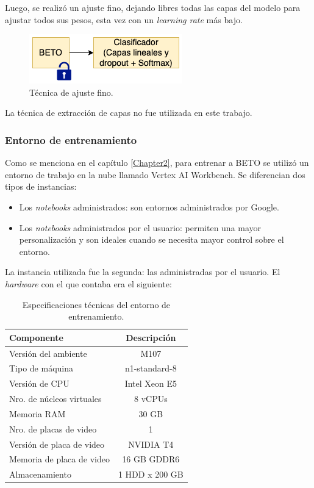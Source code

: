 Luego, se realizó un ajuste fino, dejando libres todas las capas del modelo para ajustar todos sus pesos, esta vez con un \textit{learning rate} más bajo.

\begin{figure}[htbp]
	\centering
	\includegraphics[width=.4\textwidth]{./Figures/cap3-fine-tuning.png}
	\caption{Técnica de ajuste fino.}
	\label{fig:cap3-fine-tuning}
\end{figure}

La técnica de extracción de capas no fue utilizada en este trabajo.

\subsubsection{Entorno de entrenamiento}

Como se menciona en el capítulo \ref{Chapter2}, para entrenar a BETO se utilizó un entorno de trabajo en la nube llamado Vertex AI Workbench. Se diferencian dos tipos de instancias:
\begin{itemize}
	\item Los \textit{notebooks} administrados: son entornos administrados por Google.
	\item Los \textit{notebooks} administrados por el usuario: permiten una mayor personalización y son ideales cuando se necesita mayor control sobre el entorno.
\end{itemize}

La instancia utilizada fue la segunda: las administradas por el usuario. El \textit{hardware} con el que contaba era el siguiente:
\begin{table}[h]
	\centering
	\caption[Especificaciones técnicas Vertex]{Especificaciones técnicas del entorno de entrenamiento.}
	\begin{tabular}{l c}    
		\toprule
		\textbf{Componente}			& 			\textbf{Descripción}  \\
		\midrule	
		Versión del ambiente		& 			M107  \\
		Tipo de máquina 			& 			n1-standard-8  \\
		Versión de CPU				&			Intel Xeon E5 \\
		Nro. de núcleos virtuales 	& 			8 vCPUs \\
		Memoria RAM 				& 			30 GB  \\
		Nro. de placas de video 	& 			1  \\
		Versión de placa de video 	& 			NVIDIA T4 \\
		Memoria de placa de video	& 			16 GB GDDR6  \\
		Almacenamiento				&			1 HDD x 200 GB \\
		\bottomrule
		\hline
	\end{tabular}
	\label{tab:vertex}
\end{table}

